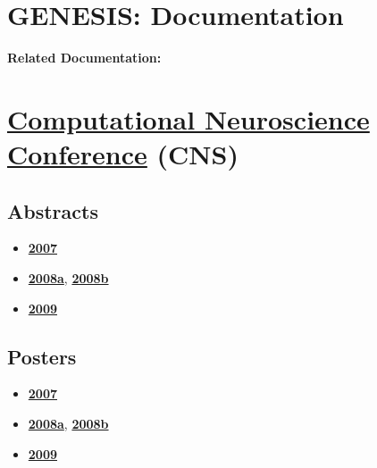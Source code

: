 \documentclass[12pt]{article}
\begin{document}
\section*{GENESIS: Documentation}

{\bf Related Documentation:}

\section*{\href{http://www.cnsorg.org/meetings/}{Computational Neuroscience Conference} (CNS)}

\subsection*{Abstracts}

\begin{itemize}
\item \href{../cns07/BMCNeurosci.8.S2.P4.pdf}{\bf 2007}
\item \href{../cns08/BMCNeurosci.9.S1.P88.pdf}{\bf 2008a}, \href{../cns08/BMCNeurosci.9.S1.P87.pdf}{\bf 2008b}
\item \href{../cns09/BMCNeurosci.10.S1.P52.pdf}{\bf 2009}
\end{itemize}

\subsection*{Posters}

\begin{itemize}
\item \href{../cns07/poster07.pdf}{\bf 2007}
\item \href{../cns08/poster08a.pdf}{\bf 2008a}, \href{../cns08/poster08b.pdf}{\bf 2008b}
\item \href{../cns09/poster09.pdf}{\bf 2009}
\end{itemize}
\end{document}
